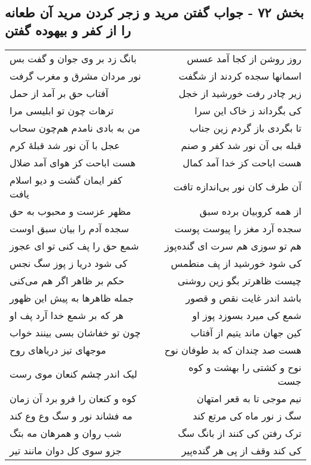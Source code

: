 \begin{center}
\section*{بخش ۷۲ - جواب گفتن مرید و زجر کردن مرید آن طعانه را از کفر و بیهوده گفتن}
\label{sec:sh072}
\begin{longtable}{l p{0.5cm} r}
بانگ زد بر وی جوان و گفت بس
&&
روز روشن از کجا آمد عسس
\\
نور مردان مشرق و مغرب گرفت
&&
اسمانها سجده کردند از شگفت
\\
آفتاب حق بر آمد از حمل
&&
زیر چادر رفت خورشید از خجل
\\
ترهات چون تو ابلیسی مرا
&&
کی بگرداند ز خاک این سرا
\\
من به بادی نامدم هم‌چون سحاب
&&
تا بگردی باز گردم زین جناب
\\
عجل با آن نور شد قبلهٔ کرم
&&
قبله بی آن نور شد کفر و صنم
\\
هست اباحت کز هوای آمد ضلال
&&
هست اباحت کز خدا آمد کمال
\\
کفر ایمان گشت و دیو اسلام یافت
&&
آن طرف کان نور بی‌اندازه تافت
\\
مظهر عزست و محبوب به حق
&&
از همه کروبیان برده سبق
\\
سجده آدم را بیان سبق اوست
&&
سجده آرد مغز را پیوست پوست
\\
شمع حق را پف کنی تو ای عجوز
&&
هم تو سوزی هم سرت ای گنده‌پوز
\\
کی شود دریا ز پوز سگ نجس
&&
کی شود خورشید از پف منطمس
\\
حکم بر ظاهر اگر هم می‌کنی
&&
چیست ظاهرتر بگو زین روشنی
\\
جمله ظاهرها به پیش این ظهور
&&
باشد اندر غایت نقص و قصور
\\
هر که بر شمع خدا آرد پف او
&&
شمع کی میرد بسوزد پوز او
\\
چون تو خفاشان بسی بینند خواب
&&
کین جهان ماند یتیم از آفتاب
\\
موجهای تیز دریاهای روح
&&
هست صد چندان که بد طوفان نوح
\\
لیک اندر چشم کنعان موی رست
&&
نوح و کشتی را بهشت و کوه جست
\\
کوه و کنعان را فرو برد آن زمان
&&
نیم موجی تا به قعر امتهان
\\
مه فشاند نور و سگ وع وع کند
&&
سگ ز نور ماه کی مرتع کند
\\
شب روان و همرهان مه بتگ
&&
ترک رفتن کی کنند از بانگ سگ
\\
جزو سوی کل دوان مانند تیر
&&
کی کند وقف از پی هر گنده‌پیر
\\

\end{longtable}
\end{center}
